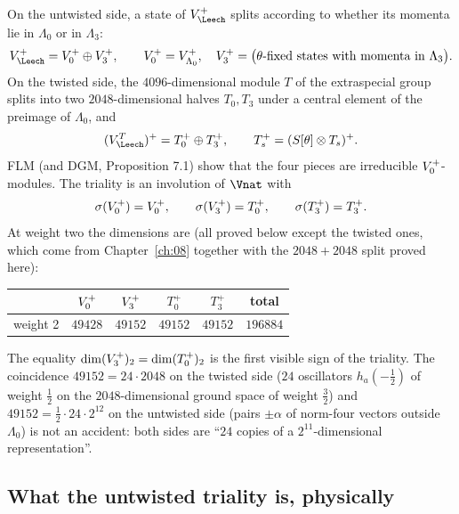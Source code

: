 On the untwisted side, a state of $V_\Leech^+$ splits according to whether its momenta lie in
$\Lambda_0$ or in $\Lambda_3$:
\begin{equation*}
  V_\Leech^+=\chelVz\oplus\chelVt,\qquad
  \chelVz=V_{\Lambda_0}^+,\quad \chelVt=\big(\text{$\theta$-fixed states with momenta in }\Lambda_3\big).
\end{equation*}
On the twisted side, the $4096$-dimensional module $T$ of the extraspecial group splits into two
$2048$-dimensional halves $T_0,T_3$ under a central element of the preimage of $\Lambda_0$, and
\begin{equation*}
  (V_\Leech^T)^+=T_0^+\oplus T_3^+,\qquad T_s^+=(S[\theta]\otimes T_s)^+ .
\end{equation*}
FLM (and DGM, Proposition 7.1) show that the four pieces are irreducible $V_0^{+}$-modules.  The
triality is an involution of $\Vnat$ with
\begin{equation}\label{ch11:eq:sigmapattern}
  \sigma(V_0^{+})=V_0^{+},\qquad \sigma(V_3^{+})=T_0^+,\qquad \sigma(T_3^+)=T_3^+ .
\end{equation}
At weight two the dimensions are (all proved below except the twisted ones, which come from
Chapter~\ref{ch:08} together with the $2048+2048$ split proved here):
\begin{center}
\begin{tabular}{lccccc}
\toprule
 & $V_0^{+}$ & $V_3^{+}$ & $T_0^+$ & $T_3^+$ & total\\
\midrule
weight 2 & $49428$ & $49152$ & $49152$ & $49152$ & $196884$\\
\bottomrule
\end{tabular}
\end{center}
The equality $\dim(V_3^{+})_2=\dim(T_0^+)_2$ is the first visible sign of the triality.  The
coincidence $49152=24\cdot2048$ on the twisted side ($24$ oscillators $h_a(-\tfrac12)$ of weight
$\tfrac12$ on the $2048$-dimensional ground space of weight $\tfrac32$) and $49152=\tfrac12\cdot
24\cdot 2^{12}$ on the untwisted side (pairs $\pm\alpha$ of norm-four vectors outside $\Lambda_0$) is
not an accident: both sides are ``$24$ copies of a $2^{11}$-dimensional representation''.

\subsection{What the untwisted triality is, physically}

